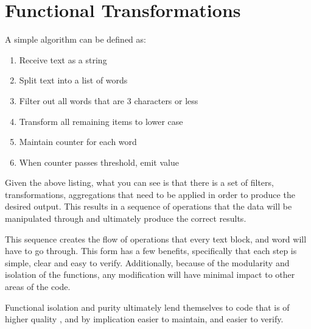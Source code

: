\chapter{Functional Transformations}

A simple algorithm can be defined as:

\begin{enumerate}
  \item Receive text as a string
  \item Split text into a list of words
  \item Filter out all words that are 3 characters or less
  \item Transform all remaining items to lower case
  \item Maintain counter for each word 
  \item When counter passes threshold, emit value
\end{enumerate}

Given the above listing, what you can see is that there is a set of filters, transformations, aggregations that need to be applied in order to produce the desired output.  This results in a sequence of operations that the data will be manipulated through and ultimately produce the correct results.

This sequence creates the flow of operations that every text block, and word will have to go through.  This form has a few benefits, specifically that each step is simple, clear and easy to verify.  Additionally, because of the modularity and isolation of the functions, any modification will have minimal impact to other areas of the code.

Functional isolation and purity ultimately lend themselves to code that is of higher quality \cite{langstudy14}, and by implication easier to maintain, and easier to verify.


%